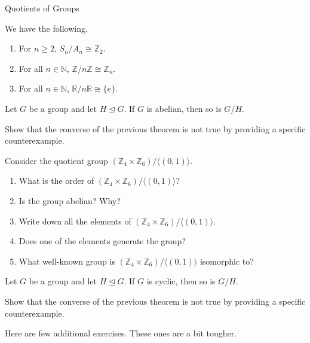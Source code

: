 \begin{section}{Quotients of Groups}
\begin{theorem}
We have the following.
\begin{enumerate}[label=\textrm{(\alph*)}]
\item For $n\geq 2$, $S_n/A_n\cong \mathbb{Z}_2$.
\item For all $n\in\mathbb{N}$, $\mathbb{Z}/n\mathbb{Z}\cong \mathbb{Z}_n$.
\item For all $n\in\mathbb{N}$, $\mathbb{R}/n\mathbb{R}\cong \{e\}$.
\end{enumerate}
\end{theorem}

\begin{theorem}
Let $G$ be a group and let $H\trianglelefteq G$.  If $G$ is abelian, then so is $G/H$.
\end{theorem}

\begin{problem}
Show that the converse of the previous theorem is not true by providing a specific counterexample.
\end{problem}

\begin{problem}
Consider the quotient group $(\mathbb{Z}_4\times \mathbb{Z}_6)/\langle (0,1)\rangle$.
\begin{enumerate}[label=\textrm{(\alph*)}]
\item What is the order of $(\mathbb{Z}_4\times \mathbb{Z}_6)/\langle (0,1)\rangle$?
\item Is the group abelian?  Why?
\item Write down all the elements of $(\mathbb{Z}_4\times \mathbb{Z}_6)/\langle (0,1)\rangle$.
\item Does one of the elements generate the group?
\item What well-known group is $(\mathbb{Z}_4\times \mathbb{Z}_6)/\langle (0,1)\rangle$ isomorphic to?
\end{enumerate}
\end{problem}

\begin{theorem}
Let $G$ be a group and let $H\trianglelefteq G$.  If $G$ is cyclic, then so is $G/H$.
\end{theorem}

\begin{problem}
Show that the converse of the previous theorem is not true by providing a specific counterexample.
\end{problem}

Here are few additional exercises.  These ones are a bit tougher.


\end{section}
